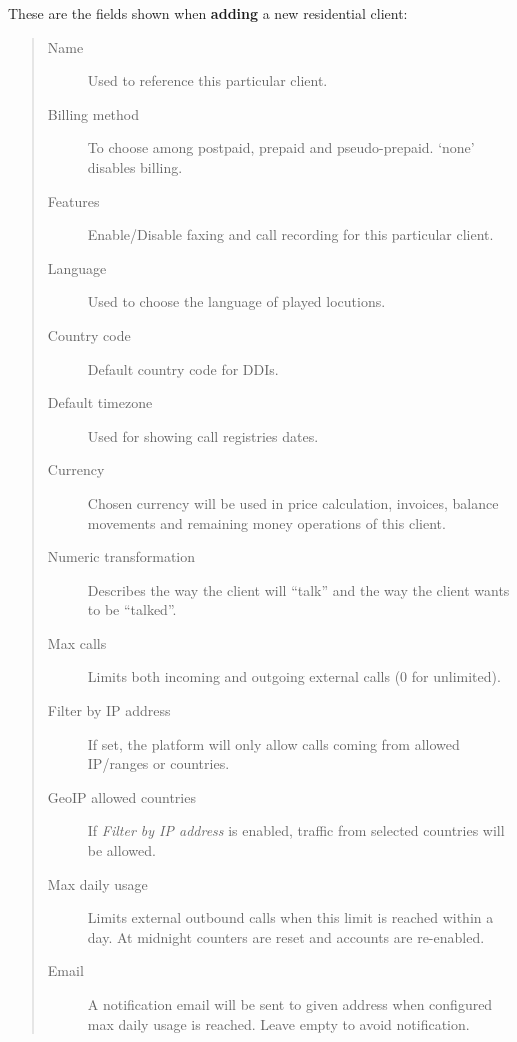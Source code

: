 \documentclass[letterpaper,10pt,english]{sphinxmanual}
\begin{document}
These are the fields shown when \textbf{adding} a new residential client:
\begin{quote}
\begin{description}
\item[{Name}] \leavevmode
Used to reference this particular client.

\item[{Billing method}] \leavevmode
To choose among postpaid, prepaid and pseudo-prepaid. `none' disables billing.

\item[{Features}] \leavevmode
Enable/Disable faxing and call recording for this particular client.

\item[{Language}] \leavevmode
Used to choose the language of played locutions.

\item[{Country code}] \leavevmode
Default country code for DDIs.

\item[{Default timezone}] \leavevmode
Used for showing call registries dates.

\item[{Currency}] \leavevmode
Chosen currency will be used in price calculation, invoices, balance movements and
remaining money operations of this client.

\item[{Numeric transformation}] \leavevmode
Describes the way the client will ``talk'' and the way the client wants to be ``talked''.

\item[{Max calls}] \leavevmode
Limits both incoming and outgoing external calls (0 for unlimited).

\item[{Filter by IP address}] \leavevmode
If set, the platform will only allow calls coming from allowed IP/ranges or countries.

\item[{GeoIP allowed countries}] \leavevmode
If \emph{Filter by IP address} is enabled, traffic from selected countries will be allowed.

\item[{Max daily usage}] \leavevmode
Limits external outbound calls when this limit is reached within a day. At midnight counters are reset and
accounts are re-enabled.

\item[{Email}] \leavevmode
A notification email will be sent to given address when configured max daily usage is reached. Leave empty to
avoid notification.

\end{description}
\end{quote}
\end{document}
